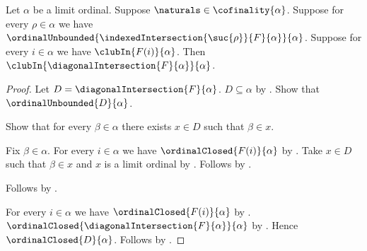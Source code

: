\begin{theorem}\label{diagonal_club_intersection_from_prefixes}
    Let $\alpha$ be a limit ordinal.
    Suppose $\naturals\in\cofinality{\alpha}$.
    Suppose for every $\rho\in\alpha$ we have
        $\ordinalUnbounded{
            \indexedIntersection{\suc{\rho}}{F}{\alpha}}{\alpha}$.
    Suppose for every $i\in\alpha$ we have $\clubIn{F(i)}{\alpha}$.
    Then $\clubIn{\diagonalIntersection{F}{\alpha}}{\alpha}$.
\end{theorem}
\begin{proof}
    Let $D=\diagonalIntersection{F}{\alpha}$.
    $D\subseteq\alpha$ by .
    Show that $\ordinalUnbounded{D}{\alpha}$.
    \begin{subproof}
        Show that for every $\beta\in\alpha$ there exists $x\in D$
            such that $\beta\in x$.
        \begin{subproof}
            Fix $\beta\in\alpha$.
            For every $i\in\alpha$ we have
                $\ordinalClosed{F(i)}{\alpha}$
                by .
            Take $x\in D$ such that $\beta\in x$ and
                $x$ is a limit ordinal
                by .
            Follows by \auto.
        \end{subproof}
        Follows by .
    \end{subproof}
    For every $i\in\alpha$ we have $\ordinalClosed{F(i)}{\alpha}$
        by .
    $\ordinalClosed{\diagonalIntersection{F}{\alpha}}{\alpha}$
        by .
    Hence $\ordinalClosed{D}{\alpha}$.
    Follows by .
\end{proof}

